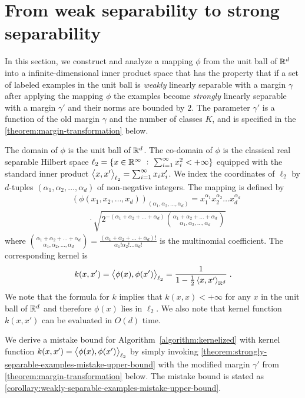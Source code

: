 \section{From weak separability to strong separability}
\label{section:from-weak-separability-to-strong-separability}

In this section, we construct and analyze a mapping $\phi$ from the unit ball of
$\mathbb{R}^d$ into a infinite-dimensional inner product space that has the property
that if a set of labeled examples in the unit ball is \emph{weakly} linearly
separable with a margin $\gamma$ after applying the mapping $\phi$ the examples
become \emph{strongly} linearly separable with a margin $\gamma'$ and their
norms are bounded by $2$. The parameter $\gamma'$ is a function of the old
margin $\gamma$ and the number of classes $K$, and is specified in the
\autoref{theorem:margin-transformation} below.

The domain of $\phi$ is the unit ball of $\mathbb{R}^d$. The co-domain of $\phi$ is the
classical real separable Hilbert space $\ell_2 = \{ x \in \mathbb{R}^\infty ~:~
\sum_{i=1}^\infty x_i^2 < + \infty \}$ equipped with the standard inner product
$\left\langle x, x' \right\rangle_{\ell_2} = \sum_{i=1}^\infty x_i x'_i$. We index the coordinates of
$\ell_2$ by $d$-tuples $(\alpha_1, \alpha_2, \dots, \alpha_d)$ of non-negative
integers. The mapping is defined by
\begin{align*}
& \left(\phi(x_1, x_2, \dots, x_d)\right)_{(\alpha_1, \alpha_2, \dots, \alpha_d)} = x_1^{\alpha_1} x_2^{\alpha_2} \dots x_d^{\alpha_d} \\
& \qquad \cdot \sqrt{2^{-(\alpha_1 + \alpha_2 + \dots + \alpha_d)} \binom{\alpha_1 + \alpha_2 + \dots + \alpha_d}{\alpha_1, \alpha_2, \dots, \alpha_d}}
\end{align*}
where $\binom{\alpha_1 + \alpha_2 + \dots + \alpha_d}{\alpha_1, \alpha_2, \dots, \alpha_d} = \frac{(\alpha_1 + \alpha_2 + \dots + \alpha_d)!}{\alpha_1! \alpha_2! \dots \alpha_d!}$
is the multinomial coefficient. The corresponding kernel is
$$
k(x,x') = \left\langle \phi(x), \phi(x') \right\rangle_{\ell_2} = \frac{1}{1 - \frac{1}{2}\left\langle x, x' \right\rangle_{\mathbb{R}^d}} \; .
$$
We note that the formula for $k$ implies that $k(x,x) < +\infty$ for any $x$ in
the unit ball of $\mathbb{R}^d$ and therefore $\phi(x)$ lies in $\ell_2$. We also note
that kernel function $k(x,x')$ can be evaluated in $O(d)$ time.

We derive a mistake bound for Algorithm~\ref{algorithm:kernelized} with kernel
function $k(x,x') = \left\langle \phi(x), \phi(x') \right\rangle_{\ell_2}$ by simply invoking
\autoref{theorem:strongly-separable-examples-mistake-upper-bound} with the
modified margin $\gamma'$ from \autoref{theorem:margin-transformation} below.
The mistake bound is stated as \autoref{corollary:weakly-separable-examples-mistake-upper-bound}.


